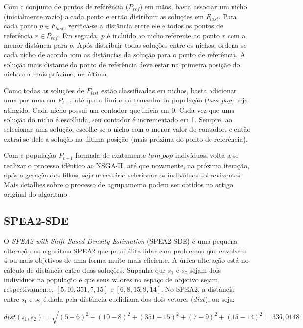 Com o conjunto de pontos de referência ($P_{ref}$) em mãos, basta associar um nicho (inicialmente vazio) a cada ponto e então distribuir as soluções em $F_{last}$. Para cada ponto $p \in F_{last}$, verifica-se a distância entre ele e todos os pontos de referência $r \in P_{ref}$. Em seguida, $p$ é incluído ao nicho referente ao ponto $r$ com a menor distância para $p$. Após distribuir todas soluções entre os nichos, ordena-se cada nicho de acordo com as distâncias da solução para o ponto de referência. A solução mais distante do ponto de referência deve estar na primeira posição do nicho e a mais próxima, na última.

Como todas as soluções de $F_{last}$ estão classificadas em nichos, basta adicionar uma por uma em $P_{t+1}$ até que o limite no tamanho da população ($tam\_pop$) seja atingido. Cada nicho possui um contador que inicia em 0. Cada vez que uma solução do nicho é escolhida, seu contador é incrementado em 1. Sempre, ao selecionar uma solução, escolhe-se o nicho com o menor valor de contador, e então extrai-se dele a solução na última posição (mais próxima do ponto de referência).

Com a população $P_{t+1}$ formada de exatamente $tam\_pop$ indivíduos, volta a se realizar o processo idêntico ao NSGA-II, até que novamente, na próxima iteração, após a geração dos filhos, seja necessário selecionar os indivíduos sobreviventes. Mais detalhes sobre o processo de agrupamento podem ser obtidos no artigo original do algoritmo \cite{Deb2014}.

\subsection{SPEA2-SDE}

O \textit{SPEA2 with Shift-Based Density Estimation} (SPEA2-SDE) \cite{Spea2SDE} é uma pequena alteração no algoritmo SPEA2 que possibilita lidar com problemas que envolvam 4 ou mais objetivos de uma forma muito mais eficiente. A única alteração está no cálculo de distância entre duas soluções. Suponha que $s_1$ e $s_2$ sejam dois indivíduos na população e que seus valores no espaço de objetivo sejam, respectivamente, $[5, 10, 351, 7, 15]$ e $[6, 8, 15, 9, 14]$. No SPEA2, a distância entre $s_1$ e $s_2$ é dada pela distância euclidiana dos dois vetores ($dist$), ou seja:

\begin{equation}dist(s_1, s_2) = \sqrt{(5-6)^2 + (10-8)^2 + (351-15)^2 + (7-9)^2 + (15-14)^2} = 336,0148\end{equation}

